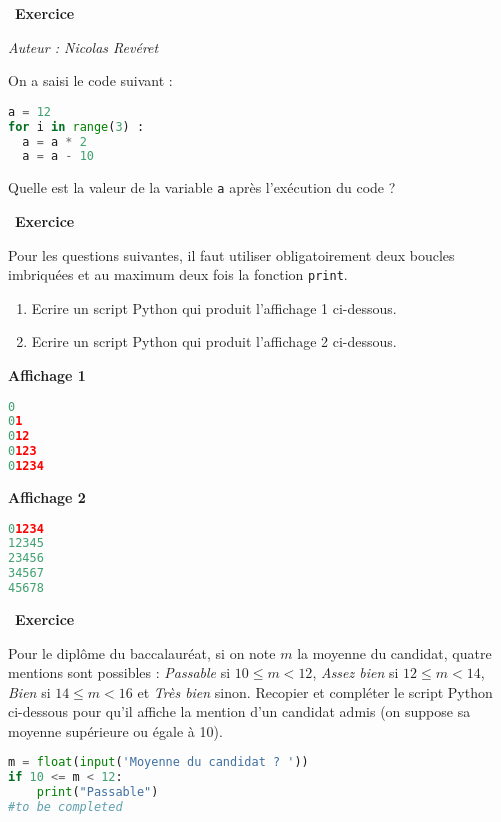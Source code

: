 \documentclass[
  11pt,
]{article}
\newcommand{\passthrough}[1]{#1}
\providecommand{\tightlist}{%
  \setlength{\itemsep}{0pt}\setlength{\parskip}{0pt}}
\newcounter{exo}
\newenvironment{exercice}[1]
{\par \medskip   \addtocounter{exo}{1} \noindent  
\begin{bclogo}[arrondi =0.1,   noborder = true, logo=\bccrayon, marge=4]{~\textbf{Exercice} \textbf{\theexo} {\itshape #1} }  \par}
{
\end{bclogo}
 \par \bigskip }
\newcounter{def}
\begin{document}
\begin{exercice}{}

\emph{Auteur : Nicolas Revéret}

On a saisi le code suivant :

\begin{lstlisting}[language=Python]
a = 12
for i in range(3) :
  a = a * 2
  a = a - 10
\end{lstlisting}

Quelle est la valeur de la variable \passthrough{\lstinline!a!} après
l'exécution du code ?

\end{exercice}

\begin{exercice}{}

Pour les questions suivantes, il faut utiliser obligatoirement deux
boucles imbriquées et au maximum deux fois la fonction \verb+print+.

\begin{enumerate}
\def\labelenumi{\arabic{enumi}.}
\tightlist
\item
  Ecrire un script Python qui produit l'affichage 1 ci-dessous.
\item
  Ecrire un script Python qui produit l'affichage 2 ci-dessous.
\end{enumerate}

\textbf{Affichage 1}

\begin{lstlisting}[language=Python]
0
01
012
0123
01234
\end{lstlisting}

\textbf{Affichage 2}

\begin{lstlisting}[language=Python]
01234
12345
23456
34567
45678
\end{lstlisting}

\end{exercice}

\begin{exercice}{}

Pour le diplôme du baccalauréat, si on note \(m\) la moyenne du
candidat, quatre mentions sont possibles : \emph{Passable} si
\(10 \leqslant m < 12\), \emph{Assez bien} si \(12 \leqslant m < 14\),
\emph{Bien} si \(14 \leqslant m < 16\) et \emph{Très bien} sinon.
Recopier et compléter le script Python ci-dessous pour qu'il affiche la
mention d'un candidat admis (on suppose sa moyenne supérieure ou égale à
10).

\begin{lstlisting}[language=Python]
m = float(input('Moyenne du candidat ? '))
if 10 <= m < 12:
    print("Passable")
#to be completed
\end{lstlisting}

\end{exercice}
\end{document}
